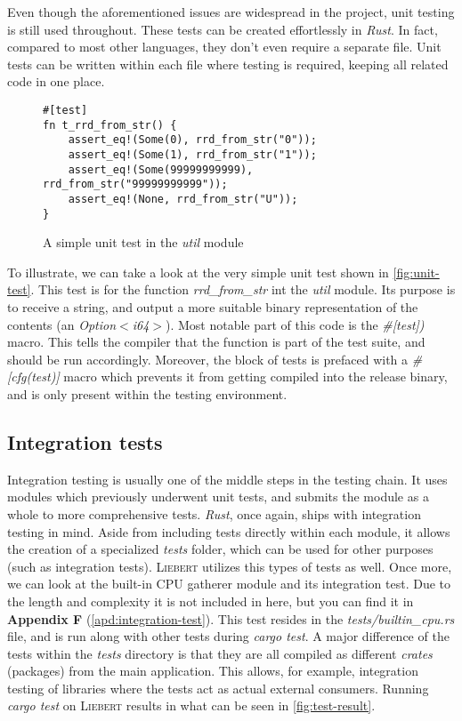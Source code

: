         Even though the aforementioned issues are widespread in the project, unit testing is still used throughout. These tests can be created effortlessly in \textit{Rust}. In fact, compared to most other languages, they don't even require a separate file. Unit tests can be written within each file where testing is required, keeping all related code in one place.
        
        \begin{figure}[!htb]
            \centering
            \begin{BVerbatim}
#[test]
fn t_rrd_from_str() {
    assert_eq!(Some(0), rrd_from_str("0"));
    assert_eq!(Some(1), rrd_from_str("1"));
    assert_eq!(Some(99999999999), rrd_from_str("99999999999"));
    assert_eq!(None, rrd_from_str("U"));
}
            \end{BVerbatim}
            \caption{A simple unit test in the \textit{util} module}
            \label{fig:unit-test}
        \end{figure}
        
        To illustrate, we can take a look at the very simple unit test shown in \autoref{fig:unit-test}. This test is for the function \textit{rrd\_from\_str} int the \textit{util} module. Its purpose is to receive a string, and output a more suitable binary representation of the contents (an \textit{Option$<$i64$>$}). Most notable part of this code is the \textit{\#[test])} macro. This tells the compiler that the function is part of the test suite, and should be run accordingly. Moreover, the block of tests is prefaced with a \textit{\#[cfg(test)]} macro which prevents it from getting compiled into the release binary, and is only present within the testing environment.
    
    
    \subsection{Integration tests}
        Integration testing is usually one of the middle steps in the testing chain. It uses modules which previously underwent unit tests, and submits the module as a whole to more comprehensive tests. \textit{Rust}, once again, ships with integration testing in mind. Aside from including tests directly within each module, it allows the creation of a specialized \textit{tests} folder, which can be used for other purposes (such as integration tests). \textsc{Liebert} utilizes this types of tests as well. Once more, we can look at the built-in CPU gatherer module and its integration test. Due to the length and complexity it is not included in here, but you can find it in \textbf{Appendix F} (\autoref{apd:integration-test}). This test resides in the \textit{tests/builtin\_cpu.rs} file, and is run along with other tests during \textit{cargo test}. A major difference of the tests within the \textit{tests} directory is that they are all compiled as different \textit{crates} (packages) from the main application. This allows, for example, integration testing of libraries where the tests act as actual external consumers. Running \textit{cargo test} on \textsc{Liebert} results in what can be seen in \autoref{fig:test-result}.
        
